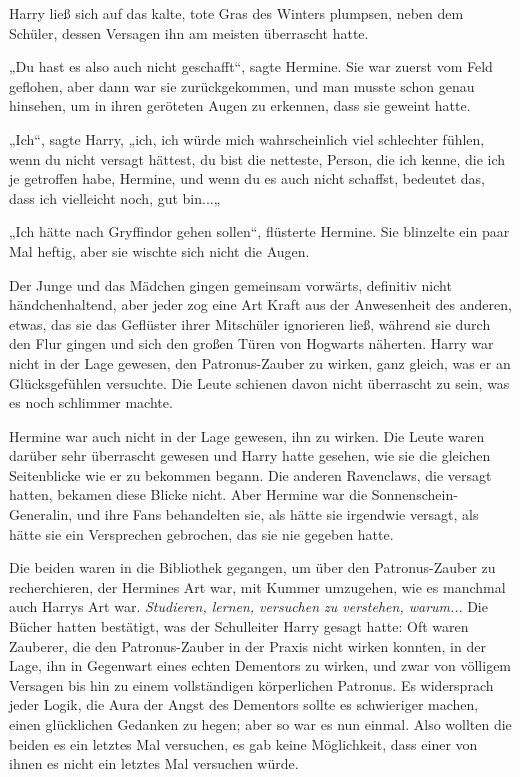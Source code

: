 {Harry ließ sich auf das kalte, tote Gras des Winters plumpsen, neben dem Schüler, dessen Versagen ihn am meisten überrascht hatte.

„Du hast es also auch nicht geschafft“, sagte Hermine. Sie war zuerst vom Feld geflohen, aber dann war sie zurückgekommen, und man musste schon genau hinsehen, um in ihren geröteten Augen zu erkennen, dass sie geweint hatte.

„Ich“, sagte Harry, „ich, ich würde mich wahrscheinlich viel schlechter fühlen, wenn du nicht versagt hättest, du bist die netteste, Person, die ich kenne, die ich je getroffen habe, Hermine, und wenn du es auch nicht schaffst, bedeutet das, dass ich vielleicht noch, gut bin...„

„Ich hätte nach Gryffindor gehen sollen“, flüsterte Hermine. Sie blinzelte ein paar Mal heftig, aber sie wischte sich nicht die Augen.

Der Junge und das Mädchen gingen gemeinsam vorwärts, definitiv nicht händchenhaltend, aber jeder zog eine Art Kraft aus der Anwesenheit des anderen, etwas, das sie das Geflüster ihrer Mitschüler ignorieren ließ, während sie durch den Flur gingen und sich den großen Türen von Hogwarts näherten. Harry war nicht in der Lage gewesen, den Patronus-Zauber zu wirken, ganz gleich, was er an Glücksgefühlen versuchte. Die Leute schienen davon nicht überrascht zu sein, was es noch schlimmer machte.

Hermine war auch nicht in der Lage gewesen, ihn zu wirken. Die Leute waren darüber sehr überrascht gewesen und Harry hatte gesehen, wie sie die gleichen Seitenblicke wie er zu bekommen begann. Die anderen Ravenclaws, die versagt hatten, bekamen diese Blicke nicht. Aber Hermine war die Sonnenschein-Generalin, und ihre Fans behandelten sie, als hätte sie irgendwie versagt, als hätte sie ein Versprechen gebrochen, das sie nie gegeben hatte.

Die beiden waren in die Bibliothek gegangen, um über den Patronus-Zauber zu recherchieren, der Hermines Art war, mit Kummer umzugehen, wie es manchmal auch Harrys Art war. \emph{Studieren, lernen, versuchen zu verstehen, warum..}. Die Bücher hatten bestätigt, was der Schulleiter Harry gesagt hatte: Oft waren Zauberer, die den Patronus-Zauber in der Praxis nicht wirken konnten, in der Lage, ihn in Gegenwart eines echten Dementors zu wirken, und zwar von völligem Versagen bis hin zu einem vollständigen körperlichen Patronus. Es widersprach jeder Logik, die Aura der Angst des Dementors sollte es schwieriger machen, einen glücklichen Gedanken zu hegen; aber so war es nun einmal. Also wollten die beiden es ein letztes Mal versuchen, es gab keine Möglichkeit, dass einer von ihnen es nicht ein letztes Mal versuchen würde.

}
